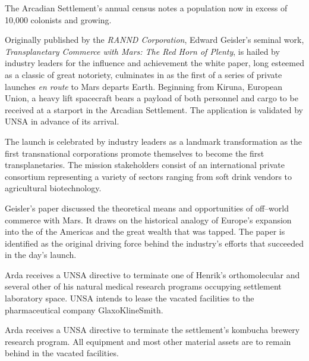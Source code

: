 

The Arcadian Settlement's annual census notes a population now in excess of 10,000 colonists and growing.
\StopTimelineDate

Originally published by the {\it RANND Corporation}, Edward Geisler's seminal work, {\it Transplanetary Commerce with Mars: The Red Horn of Plenty}, is hailed by industry leaders for the influence and achievement the white paper, long esteemed as a classic of great notoriety, culminates in as the first of a series of private launches {\it en route} to Mars departs Earth. Beginning from Kiruna, European Union, a heavy lift spacecraft bears a payload of both personnel and cargo to be received at a starport in the Arcadian Settlement. The application is validated by UNSA in advance of its arrival.

The launch is celebrated by industry leaders as a landmark transformation as the first transnational corporations promote themselves to become the first transplanetaries. The mission stakeholders consist of an international private consortium representing a variety of sectors ranging from soft drink vendors to agricultural biotechnology.

Geisler's paper discussed the theoretical means and opportunities of off--world commerce with Mars. It draws on the historical analogy of Europe's expansion into the  of the Americas and the great wealth that was tapped. The paper is identified as the original driving force behind the industry's efforts that succeeded in the day's launch.
\StopTimelineDate

Arda receives a UNSA directive to terminate one of Henrik's orthomolecular and several other of his natural medical research programs occupying settlement laboratory space. UNSA intends to lease the vacated facilities to the pharmaceutical company GlaxoKlineSmith.
\StopTimelineDate

Arda receives a UNSA directive to terminate the settlement's kombucha brewery research program. All equipment and most other material assets are to remain behind in the vacated facilities. 


